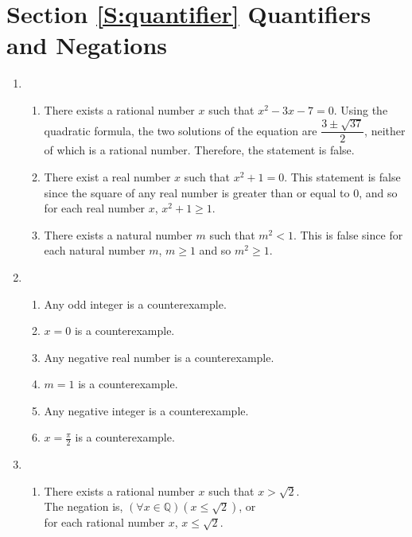 \section*{Section \ref{S:quantifier} Quantifiers and Negations}

\begin{enumerate}
\item \begin{enumerate}
\item There exists a rational number $x$ such that $x^2 - 3x - 7 = 0$.  Using the quadratic formula, the two solutions of the equation are $\dfrac{3 \pm \sqrt{37}}{2}$, neither of which is a rational number.  Therefore, the statement is false.
\item There exist a real number $x$ such that $x ^ 2 + 1 = 0$.  This statement is false since the square of any real number is greater than or equal to 0, and so for each real number $x$, $x^2 + 1 \geq 1$.
\item There exists a natural number $m$ such that $m^2 < 1$.  This is false since for each natural number $m$, $m \geq 1$ and so $m^2 \geq 1$.
\end{enumerate}



\item \begin{enumerate}
\item Any odd integer is a counterexample.
\item $x = 0$ is a counterexample.
\item Any negative real number is a counterexample.
\item $m = 1$ is a counterexample.
\item Any negative integer is a counterexample.
\item $x = \frac{\pi}{2}$ is a counterexample.
\end{enumerate}

\item \begin{enumerate}
\item There exists a rational number $x$ such that $x > \sqrt{2}$. \\
The negation is, $\left( {\forall x \in \mathbb{Q}} \right)\left( {x \leq \sqrt 2 } \right)$, or\\ for each rational number $x$, $x \le \sqrt{2}$.


\end{enumerate}
\end{enumerate}
